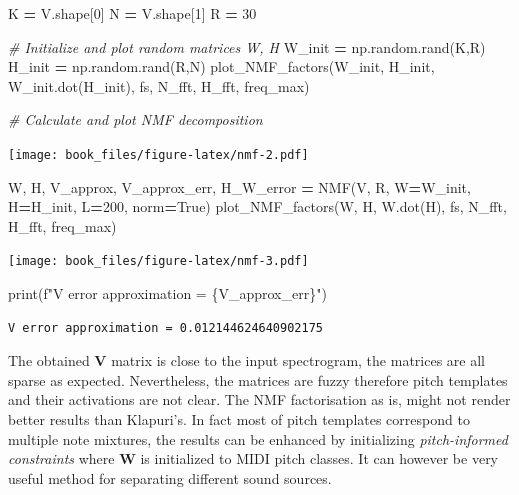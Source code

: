 \documentclass[american,]{article}
\newenvironment{Shaded}{\begin{snugshade}}{\end{snugshade}}
\newcommand{\BuiltInTok}[1]{#1}
\newcommand{\CommentTok}[1]{\textcolor[rgb]{0.56,0.35,0.01}{\textit{#1}}}
\newcommand{\DecValTok}[1]{\textcolor[rgb]{0.00,0.00,0.81}{#1}}
\newcommand{\NormalTok}[1]{#1}
\newcommand{\OperatorTok}[1]{\textcolor[rgb]{0.81,0.36,0.00}{\textbf{#1}}}
\newcommand{\SpecialCharTok}[1]{\textcolor[rgb]{0.00,0.00,0.00}{#1}}
\newcommand{\SpecialStringTok}[1]{\textcolor[rgb]{0.31,0.60,0.02}{#1}}
\newcommand{\VariableTok}[1]{\textcolor[rgb]{0.00,0.00,0.00}{#1}}
\begin{document}
\begin{Shaded}
\begin{Highlighting}[]
\NormalTok{K }\OperatorTok{=}\NormalTok{ V.shape[}\DecValTok{0}\NormalTok{]}
\NormalTok{N }\OperatorTok{=}\NormalTok{ V.shape[}\DecValTok{1}\NormalTok{]}
\NormalTok{R }\OperatorTok{=} \DecValTok{30}

\CommentTok{# Initialize and plot random matrices W, H}
\NormalTok{W_init }\OperatorTok{=}\NormalTok{ np.random.rand(K,R)}
\NormalTok{H_init }\OperatorTok{=}\NormalTok{ np.random.rand(R,N)}
\NormalTok{plot_NMF_factors(W_init, H_init, W_init.dot(H_init), fs, N_fft, H_fft, freq_max)}

\CommentTok{# Calculate and plot NMF decomposition}
\end{Highlighting}
\end{Shaded}

\texttt{[image: book\_files/figure-latex/nmf-2.pdf]}

\begin{Shaded}
\begin{Highlighting}[]
\NormalTok{W, H, V_approx, V_approx_err, H_W_error }\OperatorTok{=}\NormalTok{ NMF(V, R, W}\OperatorTok{=}\NormalTok{W_init, H}\OperatorTok{=}\NormalTok{H_init, L}\OperatorTok{=}\DecValTok{200}\NormalTok{, norm}\OperatorTok{=}\VariableTok{True}\NormalTok{)}
\NormalTok{plot_NMF_factors(W, H, W.dot(H), fs, N_fft, H_fft, freq_max)               }
\end{Highlighting}
\end{Shaded}

\texttt{[image: book\_files/figure-latex/nmf-3.pdf]}

\begin{Shaded}
\begin{Highlighting}[]
\BuiltInTok{print}\NormalTok{(}\SpecialStringTok{f"V error approximation = }\SpecialCharTok{\{}\NormalTok{V_approx_err}\SpecialCharTok{\}}\SpecialStringTok{"}\NormalTok{)}
\end{Highlighting}
\end{Shaded}

\begin{verbatim}
V error approximation = 0.012144624640902175
\end{verbatim}

The obtained \(\boldsymbol{V}\) matrix is close to the input spectrogram,
the matrices are all sparse as expected.
Nevertheless, the matrices are fuzzy therefore pitch templates
and their activations are not clear.
The NMF factorisation as is, might not render better results than Klapuri's.
In fact most of pitch templates correspond to multiple note mixtures,
the results can be enhanced by initializing \emph{pitch-informed constraints}
where \(\boldsymbol{W}\) is initialized to MIDI pitch classes.
It can however be very useful method for separating different sound sources.
\end{document}
